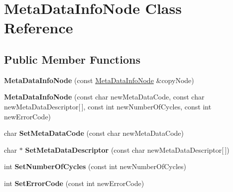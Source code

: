 \hypertarget{class_meta_data_info_node}{\section{Meta\-Data\-Info\-Node Class Reference}
\label{class_meta_data_info_node}
}
\subsection*{Public Member Functions}
\begin{DoxyCompactItemize}
\item 
\hypertarget{class_meta_data_info_node_a92c4ddf64a5306dedabf40dc80cb5890}{{\bfseries Meta\-Data\-Info\-Node} (const \hyperlink{class_meta_data_info_node}{Meta\-Data\-Info\-Node} \&copy\-Node)}\label{class_meta_data_info_node_a92c4ddf64a5306dedabf40dc80cb5890}

\item 
\hypertarget{class_meta_data_info_node_a6fe4a07a58542a7be35e54a80923e938}{{\bfseries Meta\-Data\-Info\-Node} (const char new\-Meta\-Data\-Code, const char new\-Meta\-Data\-Descriptor\mbox{[}$\,$\mbox{]}, const int new\-Number\-Of\-Cycles, const int new\-Error\-Code)}\label{class_meta_data_info_node_a6fe4a07a58542a7be35e54a80923e938}

\item 
\hypertarget{class_meta_data_info_node_a4536768e5035e36a0d65b0a023ba2501}{char {\bfseries Set\-Meta\-Data\-Code} (const char new\-Meta\-Data\-Code)}\label{class_meta_data_info_node_a4536768e5035e36a0d65b0a023ba2501}

\item 
\hypertarget{class_meta_data_info_node_adcf3b4b1a4ffcbc7a16dbad18d94d2b7}{char $\ast$ {\bfseries Set\-Meta\-Data\-Descriptor} (const char new\-Meta\-Data\-Descriptor\mbox{[}$\,$\mbox{]})}\label{class_meta_data_info_node_adcf3b4b1a4ffcbc7a16dbad18d94d2b7}

\item 
\hypertarget{class_meta_data_info_node_a119f27a96e19f328024144f5e9a86b9f}{int {\bfseries Set\-Number\-Of\-Cycles} (const int new\-Number\-Of\-Cycles)}\label{class_meta_data_info_node_a119f27a96e19f328024144f5e9a86b9f}

\item 
\hypertarget{class_meta_data_info_node_a8c9d76582c95641eb446425bfb485d9e}{int {\bfseries Set\-Error\-Code} (const int new\-Error\-Code)}\label{class_meta_data_info_node_a8c9d76582c95641eb446425bfb485d9e}


\end{DoxyCompactItemize}

